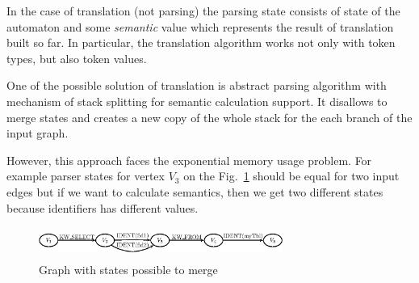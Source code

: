 
In the case of translation (not parsing) the parsing state consists of state of the automaton and some
\emph{semantic} value which represents the result of translation built so far. In particular,
the translation algorithm works not only with token types, but also token values. 

%


One of the possible solution of translation is abstract parsing algorithm with mechanism of stack 
splitting for semantic calculation support. It disallows to merge states and creates a new 
copy of the whole stack for the each branch of the input graph.

However, this approach faces the exponential memory usage problem. 
For example parser states for vertex $V_3$ on the Fig.~\ref{pic4} should be equal for two input edges
but if we want to calculate semantics, then we get two different states because identifiers has 
different values.

\begin{figure}
    \begin{center}
        \includegraphics[width=8cm,height=1.0cm]{../../graphs/states_example.eps}
        \caption{Graph with states possible to merge}
        \label{pic4}
    \end{center}
\end{figure}

